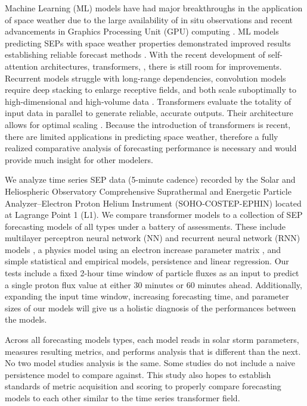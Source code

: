 Machine Learning (ML) models have had major breakthroughs in the application of space weather due to the large availability of in situ observations and recent advancements in Graphics Processing Unit (GPU) computing \cite{Camporeale2019}. ML models predicting SEPs with space weather properties demonstrated improved results establishing reliable forecast methods \cite{Posner2024,yu2026,nunez2022umasep,Dayeh2024}.
With the recent development of self-attention architectures, transformers, \cite{vaswani2017attention}, there is still room for improvements. Recurrent models struggle with long-range dependencies, convolution models require deep stacking to enlarge receptive fields, and both scale suboptimally to high-dimensional and high-volume data \cite{zhao2026transformersurvey}. Transformers evaluate the totality of input data in parallel to generate reliable, accurate outputs. Their architecture allows for optimal scaling \cite{vaswani2017attention}. Because the introduction of transformers is recent, there are limited applications in predicting space weather, therefore a fully realized comparative analysis of forecasting performance is necessary and would provide much insight for other modelers.

We analyze   time series  SEP data (5-minute cadence) recorded by the Solar and Heliospheric Observatory Comprehensive Suprathermal and Energetic Particle Analyzer--Electron Proton Helium Instrument
(SOHO-COSTEP-EPHIN) located at Lagrange Point 1 (L1). We compare transformer models to a collection of SEP forecasting models of all types under a battery of assessments. These include multilayer perceptron neural network (NN) and recurrent neural network (RNN) models \cite{torres2025machine}, a physics model using an electron increase parameter matrix \cite{posner2007forecasting}, and simple statistical and empirical models, persistence and linear regression.  
Our tests include a fixed 2-hour time window of particle fluxes as an input to predict a single proton flux value at either $30$ minutes or $60$ minutes ahead. Additionally, 
expanding the input time window, increasing forecasting time, and parameter sizes of our models will give us a holistic diagnosis of the performances
between the models.

Across  all forecasting models types, each model reads in solar storm parameters, measures resulting metrics, and performs analysis that is different than the next. No two model studies
analysis is the same. Some studies do not include a naive persistence model to compare against. This study also hopes to establish standards of metric acquisition and scoring
to properly compare forecasting models to each other similar to the time series transformer field. 

